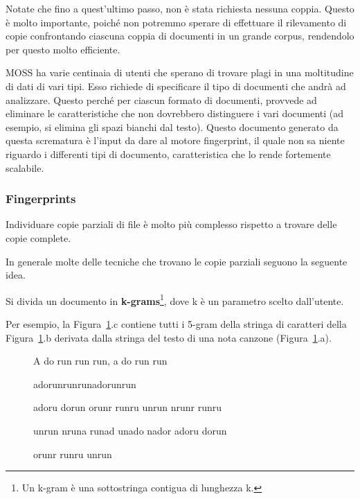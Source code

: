 			Notate che fino a quest'ultimo passo, non è stata richiesta nessuna coppia. 
			Questo è molto importante, poiché non potremmo sperare di effettuare il rilevamento di copie confrontando ciascuna coppia di documenti in un grande corpus, rendendolo per questo molto efficiente.
	
			MOSS ha varie centinaia di utenti che sperano di trovare plagi in una moltitudine di dati di vari tipi. Esso richiede di specificare il tipo di documenti che andrà ad analizzare. Questo perché per ciascun formato di documenti, provvede ad eliminare le caratteristiche che non dovrebbero distinguere i vari documenti (ad esempio, si elimina gli spazi bianchi dal testo). 
			Questo documento generato da questa scrematura è l'input da dare al motore fingerprint, il quale non sa niente riguardo i differenti tipi di documento, caratteristica che lo rende fortemente scalabile.
			
			\subsubsection{Fingerprints}\label{def:Fingerprint}
				Individuare copie parziali di file è molto più complesso rispetto a trovare delle copie complete.
				
				In generale molte delle tecniche che trovano le copie parziali seguono la seguente idea. 
				
				Si divida un documento in \textbf{k-grams}\footnote{Un k-gram è una sottostringa contigua di lunghezza k.}, dove k è un parametro scelto dall'utente.
				
				Per esempio, la Figura~\ref{img:fingerprintExample}.c contiene tutti i 5-gram della stringa di caratteri della Figura~\ref{img:fingerprintExample}.b derivata dalla stringa del testo di una nota canzone (Figura~\ref{img:fingerprintExample}.a). 
				
				\begin{figure}
					{
						\begin{tcolorbox}
							A do run run run, a do run run
						\end{tcolorbox}
					}
					{
						\begin{tcolorbox}
							adorunrunrunadorunrun
						\end{tcolorbox}
					}
					
					{
						\begin{tcolorbox}
							adoru dorun orunr runru unrun nrunr runru
							
							unrun nruna runad unado nador adoru dorun
							
							orunr runru unrun 
						\end{tcolorbox}
					}
					\label{img:fingerprintExample}
				\end{figure}

